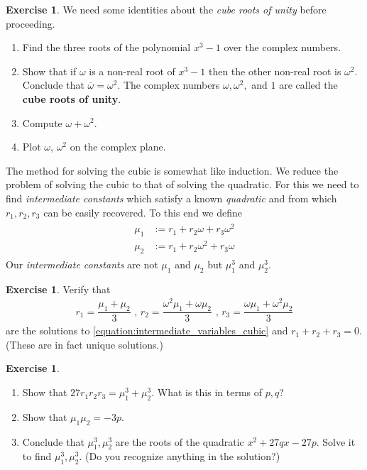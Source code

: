 \documentclass[reqno, 12pt, letter]{article}
\theoremstyle{plain}
\theoremstyle{definition}
\newtheorem{exercise}[theorem]{Exercise}
\theoremstyle{remark}
\numberwithin{equation}{section}
\begin{document}
	\begin{exercise}
	\label{exercise:cube_roots_of_unity}
	We need some identities about the \emph{cube roots of unity} before proceeding.
	\begin{enumerate}
		\item Find the three roots of the polynomial $ x^3 - 1$ over the complex numbers.
		\item Show that if $ \omega $ is a non-real root of $x^3 -1$ then the other non-real root is $ \omega^2$. Conclude that $ \overline{\omega} = \omega^2$.
			The complex numbers $\omega, \omega^2,$ and $1$ are called the \textbf{cube roots of unity}.
    \item Compute $ \omega + \omega^2$.
		\item Plot $ \omega$, $\omega^2$ on the complex plane.
	\end{enumerate}
\end{exercise}
  The method for solving the cubic is somewhat like induction. We reduce the problem of solving the cubic to that of solving the quadratic. For this we need to find \emph{intermediate constants} which satisfy a known \emph{quadratic} and from which $r_1,r_2,r_3$ can be easily recovered. To this end we define
	\begin{align}
		\label{equation:intermediate_variables_cubic}
		\begin{split}
    \mu_1 &:= r_1 + r_2 \omega + r_3 \omega^2 \\
    \mu_2 &:= r_1 + r_2 \omega^2 + r_3 \omega
	\end{split}
  \end{align} 
	Our \emph{intermediate constants} are not $ \mu_1$ and $ \mu_2$ but $ \mu_1^3$ and $ \mu_2^3$.


	\begin{exercise}
		\label{exercise:intermediate_variables_cubic_1}
		Verify that
		\begin{align*}
			r_1 = \dfrac{\mu_1 + \mu_2}{3} 
			\mbox { , } r_2 = \dfrac{\omega^2 \mu_1 + \omega \mu_2}{3}
			\mbox { , } r_3 = \dfrac{\omega \mu_1 + \omega^2 \mu_2}{3}
		\end{align*}
		are the solutions to \autoref{equation:intermediate_variables_cubic} and $ r_1 + r_2 + r_3 = 0$. (These are in fact unique solutions.)
	\end{exercise}
	


	\begin{exercise}
		\label{exercise:intermediate_variables_cubic_2}
		$ $ 
		\begin{enumerate}
			\item Show that $27r_1  r_2  r_3 = \mu_1^3 + \mu_2^3$. What is this in terms of $ p, q$?
			\item Show that $ \mu_1 \mu_2 = -3p$.
			\item Conclude that $ \mu_1^3, \mu_2^3$ are the roots of the quadratic $ x^2 + 27qx - 27p$. Solve it to find $ \mu_1^3, \mu_2^3$. (Do you recognize anything in the solution?)
		\end{enumerate}
	\end{exercise}
	
\end{document}
